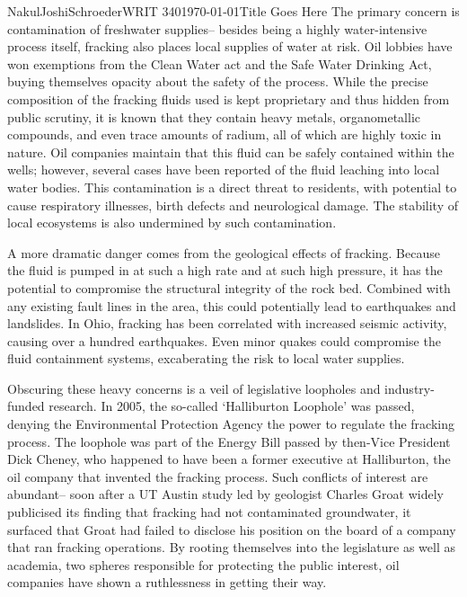 \documentclass[12pt,letterpaper]{article}
\begin{document}
\begin{mla}{Nakul}{Joshi}{Schroeder}{WRIT 340}{\today}{Title Goes Here}
The primary concern is contamination of freshwater supplies-- besides being a highly water-intensive process itself, fracking also places local supplies of water at risk. Oil lobbies have won exemptions from the Clean Water act and the Safe Water Drinking Act, buying themselves opacity about the safety of the process. While the precise composition of the fracking fluids used is kept proprietary and thus hidden from public scrutiny, it is known that they contain heavy metals, organometallic compounds, and even trace amounts of radium, all of which are highly toxic in nature. Oil companies maintain that this fluid can be safely contained within the wells; however, several cases have been reported of the fluid leaching into local water bodies. This contamination is a direct threat to residents, with potential to cause respiratory illnesses, birth defects and neurological damage. The stability of local ecosystems is also undermined by such contamination. 

A more dramatic danger comes from the geological effects of fracking. Because the fluid is pumped in at such a high rate and at such high pressure, it has the potential to compromise the structural integrity of the rock bed. Combined with any existing fault lines in the area, this could potentially lead to earthquakes and landslides. In Ohio, fracking has been correlated with increased seismic activity, causing over a hundred earthquakes. Even minor quakes could compromise the fluid containment systems, excaberating the risk to local water supplies.

Obscuring these heavy concerns is a veil of legislative loopholes and industry-funded research. In 2005, the so-called `Halliburton Loophole' was passed, denying the Environmental Protection Agency the power to regulate the fracking process. The loophole was part of the Energy Bill passed by then-Vice President Dick Cheney, who happened to have been a former executive at Halliburton, the oil company that invented the fracking process. Such conflicts of interest are abundant-- soon after a UT Austin study led by geologist Charles Groat widely publicised its finding that fracking had not contaminated groundwater, it surfaced that Groat had failed to disclose his position on the board of a company that ran fracking operations. By rooting themselves into the legislature as well as academia, two spheres responsible for protecting the public interest, oil companies have shown a ruthlessness in getting their way.





\end{mla}
\end{document}
